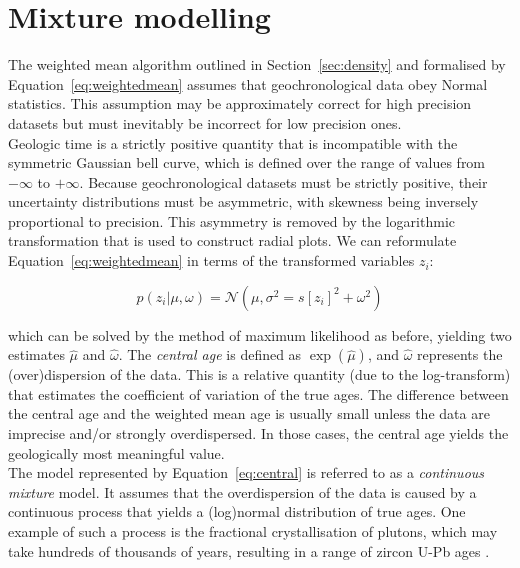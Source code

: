 \documentclass{article}
\begin{document}
\section{Mixture modelling}
\label{sec:mixtures}

The weighted mean algorithm outlined in Section~\ref{sec:density} and
formalised by Equation~\ref{eq:weightedmean} assumes that
geochronological data obey Normal statistics. This assumption may be
approximately correct for high precision datasets but must inevitably
be incorrect for low precision ones.\\

Geologic time is a strictly positive quantity that is incompatible
with the symmetric Gaussian bell curve, which is defined over the
range of values from $-\infty$ to $+\infty$. Because geochronological
datasets must be strictly positive, their uncertainty distributions
must be asymmetric, with skewness being inversely proportional to
precision. This asymmetry is removed by the logarithmic transformation
that is used to construct radial plots.  We can reformulate
Equation~\ref{eq:weightedmean} in terms of the transformed variables
$z_i$:

\begin{equation}
  p(z_i|\mu,\omega) = \mathcal{N}\left( \mu, \sigma^2 =
  s[z_i]^2+\omega^2 \right)
  \label{eq:central}
\end{equation}

\noindent which can be solved by the method of maximum likelihood as
before, yielding two estimates $\hat{\mu}$ and $\hat{\omega}$. The
\emph{central age} is defined as $\exp(\hat{\mu})$, and $\hat{\omega}$
represents the (over)dispersion of the data.  This is a relative
quantity (due to the log-transform) that estimates the coefficient of
variation of the true ages. The difference between the central age and
the weighted mean age is usually small unless the data are imprecise
and/or strongly overdispersed. In those cases, the central age yields
the geologically most meaningful value.\\

The model represented by Equation~\ref{eq:central} is referred to as a
\emph{continuous mixture} model. It assumes that the overdispersion of
the data is caused by a continuous process that yields a (log)normal
distribution of true ages. One example of such a process is the
fractional crystallisation of plutons, which may take hundreds of
thousands of years, resulting in a range of zircon U-Pb ages
\citep{rioux2012, matzel2006}.\\
\end{document}
